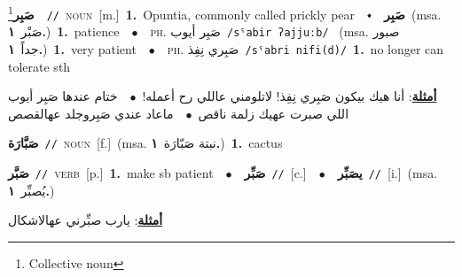 \documentclass[10pt,a4paper,twoside]{article} %
\begin{document}
\begin{multicols}{2}
{\setlength\topsep{0pt}\textbf{\foreignlanguage{arabic}{صَبِر}}\footnote{Collective noun}\ \ {\color{gray}\texttt{//}\color{black}}\ \textsc{noun}\ [m.]\ \textbf{1.}~Opuntia, commonly called prickly pear\ \ $\smblkdiamond$\ \ \setlength\topsep{0pt}\textbf{\foreignlanguage{arabic}{صَبِر}}\ \color{gray}(msa. \foreignlanguage{arabic}{صَبْر}~\foreignlanguage{arabic}{\textbf{١.}})\color{black}\ \textbf{1.}~patience\ \ $\bullet$\ \ \textsc{ph.} \color{gray} \foreignlanguage{arabic}{صَبِر أيوب}\color{black}\ {\color{gray}\texttt{/{\sffamily sˤabir ʔajjuːb}/}\color{black}}\ \color{gray} (msa. \foreignlanguage{arabic}{صبور جداً}~\foreignlanguage{arabic}{\textbf{١.}})\color{black}\ \textbf{1.}~very patient\ \ $\bullet$\ \ \textsc{ph.} \color{gray} \foreignlanguage{arabic}{صَبِري نِفِذ}\color{black}\ {\color{gray}\texttt{/{\sffamily sˤabri nifi(d)}/}\color{black}}\ \textbf{1.}~no longer can tolerate sth\  \begin{flushright}\color{gray}\foreignlanguage{arabic}{\textbf{\underline{\foreignlanguage{arabic}{أمثلة}}}: أنا هيك بيكون صَبِري نِفِذ! لاتلومني عاللي رح أعمله!\ $\bullet$\ \  ختام عندها صَبِر أيوب اللي صبرت عهيك زلمة ناقص\ $\bullet$\ \  ماعاد عندي صَبِروجلد عهالقصص}\end{flushright}\color{black}} \vspace{2mm}

{\setlength\topsep{0pt}\textbf{\foreignlanguage{arabic}{صَبَّارَة}}\ {\color{gray}\texttt{//}\color{black}}\ \textsc{noun}\ [f.]\ \color{gray}(msa. \foreignlanguage{arabic}{نبتة صَبّارَة}~\foreignlanguage{arabic}{\textbf{١.}})\color{black}\ \textbf{1.}~cactus\ } \vspace{2mm}

{\setlength\topsep{0pt}\textbf{\foreignlanguage{arabic}{صَبَّر}}\ {\color{gray}\texttt{//}\color{black}}\ \textsc{verb}\ [p.]\ \textbf{1.}~make sb patient\ \ $\bullet$\ \ \setlength\topsep{0pt}\textbf{\foreignlanguage{arabic}{صَبِّر}}\ {\color{gray}\texttt{//}\color{black}}\ [c.]\ \ $\bullet$\ \ \setlength\topsep{0pt}\textbf{\foreignlanguage{arabic}{يصَبِّر}}\ {\color{gray}\texttt{//}\color{black}}\ [i.]\ \color{gray}(msa. \foreignlanguage{arabic}{يُصبِّر}~\foreignlanguage{arabic}{\textbf{١.}})\color{black}\  \begin{flushright}\color{gray}\foreignlanguage{arabic}{\textbf{\underline{\foreignlanguage{arabic}{أمثلة}}}: يارب صبِّرني عهالاشكال}\end{flushright}\color{black}} \vspace{2mm}


\end{multicols}
\end{document}
